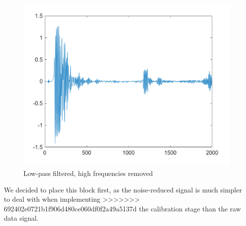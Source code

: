 \begin{figure}[H]
    \centering
    \includegraphics[width=0.5\linewidth]{figures/denoised.PNG}
    \caption{Low-pass filtered, high frequencies removed}
\end{figure}

We decided to place this block first, as the noise-reduced signal is much simpler to deal with when implementing
>>>>>>> 692402e0721b1f906d480ce060df0f2a49a5137d
 the calibration stage than the raw data signal.